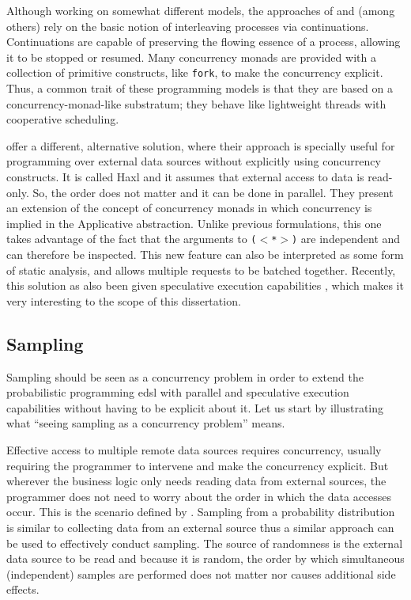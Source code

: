 \documentclass[
  oneside,
  11pt, a4paper,
  footinclude=true,
  headinclude=true,
  cleardoublepage=empty
]{scrbook}
\theoremstyle{definition}
\theoremstyle{definition}
\begin{document}
    Although working on somewhat different models, the approaches of  \cite{Claessen1999FunctionalPA} and \cite{Scholz1995ACM} (among others) rely on the basic notion of interleaving processes via continuations. Continuations are capable of preserving the flowing essence of a process, allowing it to be stopped or resumed. Many concurrency monads are provided with a collection of primitive constructs, like \texttt{fork}, to make the concurrency explicit. Thus, a common trait of these programming models is that they are based on a concurrency-monad-like substratum; they behave like lightweight threads with cooperative scheduling.
    
    \cite{Marlow:2014:NFA:2692915.2628144} offer a different, alternative solution, where their approach is specially useful for programming over external data sources without explicitly using concurrency constructs. It is called Haxl and it assumes that external access to data is read-only. So, the order does not matter and it can be done in parallel. They present an extension of the concept of concurrency monads in which concurrency is implied in the Applicative abstraction. Unlike previous formulations, this one takes advantage of the fact that the arguments to \texttt{($<$*$>$)} are independent and can therefore be inspected. This new feature can also be interpreted as some form of static analysis, and allows multiple requests to be batched together. Recently, this solution as also been given speculative execution capabilities \citep{andrey2019selective}, which makes it very interesting to the scope of this dissertation.
    
    \subsection{Sampling}
    
    Sampling should be seen as a concurrency problem in order to extend the probabilistic programming \gls{edsl} with parallel and speculative execution capabilities without having to be explicit about it. Let us start by illustrating what ``seeing sampling as a concurrency problem'' means.
    
    Effective access to multiple remote data sources requires concurrency, usually requiring the programmer to intervene and make the concurrency explicit. But wherever the business logic only needs reading data from external sources, the programmer does not need to worry about the order in which the data accesses occur. This is the scenario defined by \cite{Marlow:2014:NFA:2692915.2628144}. Sampling from a probability distribution is similar to collecting data from an external source thus a similar approach can be used to effectively conduct sampling. The source of randomness is the external data source to be read and because it is random, the order by which simultaneous (independent) samples are performed does not matter nor causes additional side effects. 
    
\end{document}
